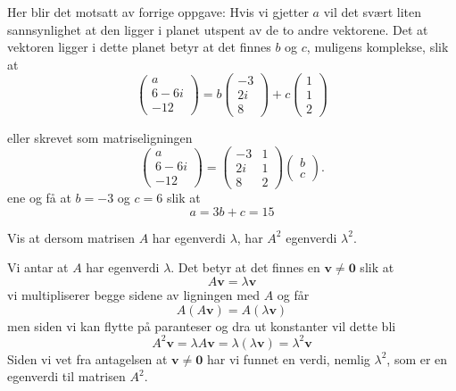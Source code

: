 \begin{losning}
	Her blir det motsatt av forrige oppgave: Hvis vi gjetter $a$ vil det svært liten sannsynlighet at den ligger i planet utspent av de to andre vektorene. Det at vektoren ligger i dette planet betyr at det finnes $b$ og $c$, muligens komplekse, slik at
	\begin{equation*}
		\begin{pmatrix}
			a\\ 6 - 6i \\ -12
		\end{pmatrix}
		= b
		\begin{pmatrix}
			-3 \\ 2i \\ 8
		\end{pmatrix}
		+ c
		\begin{pmatrix}
			1 \\ 1 \\ 2
		\end{pmatrix}
	\end{equation*}
\end{losning}
eller skrevet som matriseligningen
\begin{equation*}
	\begin{pmatrix}
		a \\ 6-6i \\ -12
	\end{pmatrix}
	=
	\begin{pmatrix}
		-3 & 1 \\
		2i & 1 \\
		8 & 2
	\end{pmatrix}
	\begin{pmatrix}
		b \\ c
	\end{pmatrix}.
\end{equation*}
ene og få at $b = -3$ og $c = 6$ slik at 
\begin{equation*}
	a = 3b + c = 15
\end{equation*}
\begin{oppgave}
Vis at dersom matrisen $A$ har egenverdi $\lambda$, har $A^2$ egenverdi $\lambda^2$.
\end{oppgave}


\begin{losning}
Vi antar at $A$ har egenverdi $\lambda$. Det betyr at det finnes en $\boldsymbol{v}\not = \boldsymbol{0}$ slik at
\begin{equation*}
A \boldsymbol{v} = \lambda \boldsymbol{v}
\end{equation*}
vi multipliserer begge sidene av ligningen med $A$ og får
\begin{equation*}
A(A\boldsymbol{v}) = A(\lambda\boldsymbol{v})
\end{equation*}
men siden vi kan flytte på paranteser og dra ut konstanter vil dette bli
\begin{equation*}
A^2\boldsymbol{v} = \lambda A\boldsymbol{v} = \lambda (\lambda \boldsymbol{v}) = \lambda^2\boldsymbol{v}
\end{equation*}
Siden vi vet fra antagelsen at $\boldsymbol{v} \not =\boldsymbol{0}$ har vi funnet en verdi, nemlig $\lambda^2$, som er en egenverdi til matrisen $A^2$.
\end{losning}

